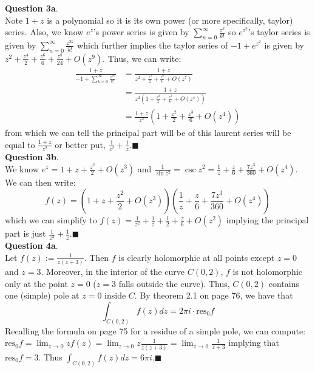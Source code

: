 \documentclass{article}
\begin{document}
    \textbf{Question 3a}.\\
    Note $1+z$ is a polynomial so it is its own power (or more specifically, taylor) series. Also, we know $e^z$'s power series
    is given by $\sum_{n=0}^{\infty} \frac{z^k}{k!}$ so $e^{z^2}$'s taylor series is given by $\sum_{n=0}^{\infty}\frac{z^{2k}}{k!}$
    which further implies the taylor series of $-1+e^{z^2}$ is given by $z^2 + \frac{z^4}{2} + \frac{z^6}{6} + \frac{z^8}{24} + O(z^9)$.
    Thus, we can write:
    \begin{align*}
        \frac{1+z}{-1 + \sum_{k=0}^{\infty}\frac{z^{2k}}{k!}} &= \frac{1 + z}{z^2 + \frac{z^4}{2} + \frac{z^6}{6} + O(z^7)} \\
        &= \frac{1+z}{z^2(1 + \frac{z^2}{2} + \frac{z^3}{6} + O(z^4))} \\
        &= \frac{1+z}{z^2}(1 + \frac{z^2}{2} + \frac{z^3}{6} + O(z^4))
    \end{align*}
    from which we can tell the principal part will be of this laurent series will be equal to $\frac{1+z}{z^2}$ or better put,
    $\frac{1}{z^2} + \frac{1}{z}$.\hfill$\blacksquare$\\

    \textbf{Question 3b}.\\
    We know $e^z = 1 + z + \frac{z^2}{2} + O(z^3)$ and $\frac{1}{\sin{z^2}} = \csc{z^2} = \frac{1}{z} + \frac{z}{6} + \frac{7z^3}{360}
    + O(z^4)$. We can then write:
    \[ f(z) = (1 + z + \frac{z^2}{2} + O(z^3))(\frac{1}{z} + \frac{z}{6} + \frac{7z^3}{360} + O(z^4)) \]
    which we can simplify to $f(z) = \frac{1}{z^2} + \frac{1}{z} + \frac{1}{2} + \frac{z}{6} + O(z^2)$ implying the principal
    part is just $\frac{1}{z^2} + \frac{1}{z}$.\hfill$\blacksquare$\\

    \textbf{Question 4a}.\\
    Let $f(z) := \frac{1}{z(z+3)}$. Then $f$ is clearly holomorphic at all points except $z=0$ and $z=3$. Moreover, in the interior
    of the curve $C(0,2)$, $f$ is not holomorphic only at the point $z=0$ ($z=3$ falls outside the curve). Thus, $C(0,2)$ contains
    one (simple) pole at $z=0$ inside $C$. By theorem 2.1 on page 76, we have that
    \[ \int_{C(0,2)} f(z)dz = 2\pi i\cdot \text{res}_{0}f \]
    Recalling the formula on page 75 for a residue of a simple pole, we can compute: $\text{res}_{0}f = \lim_{z\to 0}zf(z) = 
    \lim_{z\to 0}z \frac{1}{z(z+3)} = \lim_{z\to 0} \frac{1}{z+3}$ implying that $\text{res}_0f = 3$. Thus $\int_{C(0,2)} f(z)dz = 
    6\pi i$.\hfill$\blacksquare$\\
\end{document}
